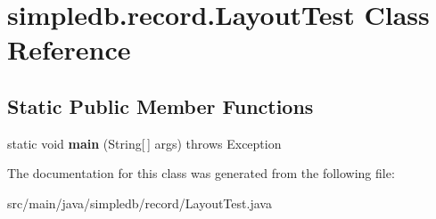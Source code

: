 \hypertarget{classsimpledb_1_1record_1_1LayoutTest}{}\section{simpledb.\+record.\+Layout\+Test Class Reference}
\label{classsimpledb_1_1record_1_1LayoutTest}
\subsection*{Static Public Member Functions}
\begin{DoxyCompactItemize}
\item 
\mbox{\label{classsimpledb_1_1record_1_1LayoutTest_a2555eb214da0a253d214c5cb8c75ae36}} 
static void {\bfseries main} (String\mbox{[}$\,$\mbox{]} args)  throws Exception 
\end{DoxyCompactItemize}


The documentation for this class was generated from the following file\+:\begin{DoxyCompactItemize}
\item 
src/main/java/simpledb/record/Layout\+Test.\+java\end{DoxyCompactItemize}
